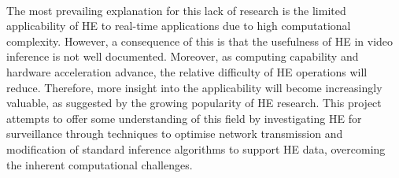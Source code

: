 \smallskip \\ \indent
The most prevailing explanation for this lack of research is the limited applicability of HE to real-time applications due to high computational complexity. However, a consequence of this is that the usefulness of HE in video inference is not well documented. Moreover, as computing capability and hardware acceleration advance, the relative difficulty of HE operations will reduce. Therefore, more insight into the applicability will become increasingly valuable, as suggested by the growing popularity of HE research. This project attempts to offer some understanding of this field by investigating HE for surveillance through techniques to optimise network transmission and modification of standard inference algorithms to support HE data, overcoming the inherent computational challenges.






